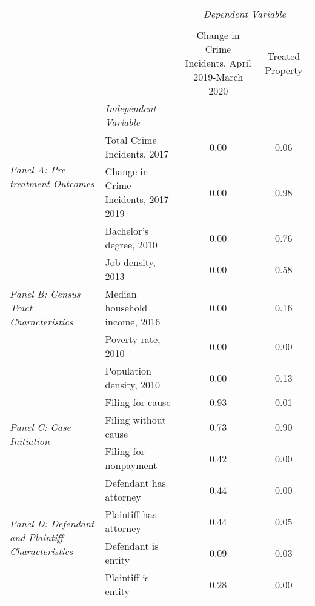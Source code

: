 \begin{tabular}{llcc}
\toprule
 &  & \multicolumn{2}{c}{\textit{Dependent Variable}} \\
\cline{3-4}
\\
 &  & Change in Crime Incidents, April 2019-March 2020 & Treated Property \\
 & \emph{Independent Variable} &  &  \\
\midrule
\multirow[c]{2}{3cm}{\textit{Panel A: Pre-treatment Outcomes}} & Total Crime Incidents, 2017 & 0.00 & 0.06 \\
 & Change in Crime Incidents, 2017-2019 & 0.00 & 0.98 \\
\cline{1-4}
\multirow[c]{5}{3cm}{\textit{Panel B: Census Tract Characteristics}} & Bachelor's degree, 2010 & 0.00 & 0.76 \\
 & Job density, 2013 & 0.00 & 0.58 \\
 & Median household income, 2016 & 0.00 & 0.16 \\
 & Poverty rate, 2010 & 0.00 & 0.00 \\
 & Population density, 2010 & 0.00 & 0.13 \\
\cline{1-4}
\multirow[c]{3}{3cm}{\textit{Panel C: Case Initiation}} & Filing for cause & 0.93 & 0.01 \\
 & Filing without cause & 0.73 & 0.90 \\
 & Filing for nonpayment & 0.42 & 0.00 \\
\cline{1-4}
\multirow[c]{4}{3cm}{\textit{Panel D: Defendant and Plaintiff Characteristics}} & Defendant has attorney & 0.44 & 0.00 \\
 & Plaintiff has attorney & 0.44 & 0.05 \\
 & Defendant is entity & 0.09 & 0.03 \\
 & Plaintiff is entity & 0.28 & 0.00 \\
\cline{1-4}
\bottomrule
\end{tabular}
